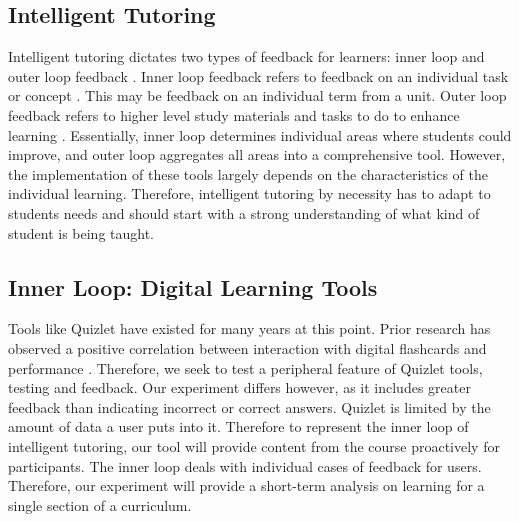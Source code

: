 \documentclass[acmtog]{acmart}
\begin{document}
\subsection{Intelligent Tutoring}
Intelligent tutoring dictates two types of feedback for learners: inner loop and outer loop feedback \cite{tacoma2021combined}. Inner loop feedback refers to feedback on an individual task or concept \cite{tacoma2021combined}. This may be feedback on an individual term from a unit. Outer loop feedback refers to higher level study materials and tasks to do to enhance learning \cite{tacoma2021combined}. Essentially, inner loop determines individual areas where students could improve, and outer loop aggregates all areas into a comprehensive tool. However, the implementation of these tools largely depends on the characteristics of the individual learning. Therefore, intelligent tutoring by necessity has to adapt to students needs and should start with a strong understanding of what kind of student is being taught.
\subsection{Inner Loop: Digital Learning Tools}
Tools like Quizlet have existed for many years at this point. Prior research has observed a positive correlation between interaction with digital flashcards and performance \cite{yuksel2020digital}. Therefore, we seek to test a peripheral feature of Quizlet tools, testing and feedback. Our experiment differs however, as it includes greater feedback than indicating incorrect or correct answers. Quizlet is limited by the amount of data a user puts into it. Therefore to represent the inner loop of intelligent tutoring, our tool will provide content from the course proactively for participants. The inner loop deals with individual cases of feedback for users. Therefore, our experiment will provide a short-term analysis on learning for a single section of a curriculum.  
\end{document}
